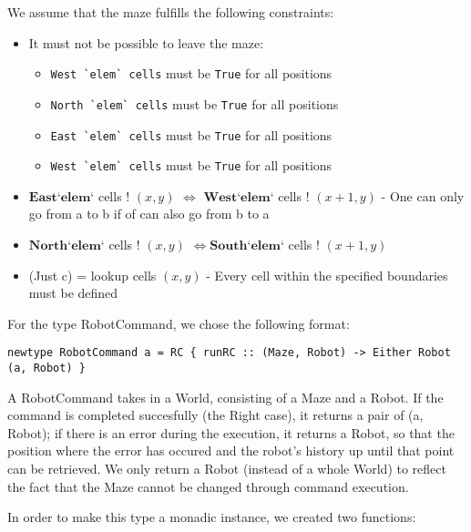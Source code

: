 \documentclass[a4paper]{article}
\newcommand{\west}{\ensuremath{\textbf{West}}\xspace}
\newcommand{\east}{\ensuremath{\textbf{East}}\xspace}
\newcommand{\south}{\ensuremath{\textbf{South}}\xspace}
\newcommand{\north}{\ensuremath{\textbf{North}}\xspace}
\newcommand{\el}{\ensuremath{\textbf{`elem`}}\xspace}
\begin{document}
We assume that the maze fulfills the following constraints:  

\begin{itemize}
  \item It must not be possible to leave the maze:
    \begin{itemize}\setlength{\itemsep}{-2pt}
      \item \verb|West `elem` cells| must be \texttt{True} for all positions 
      \item \verb|North `elem` cells| must be \texttt{True} for all positions 
      \item \verb|East `elem` cells| must be \texttt{True} for all positions 
      \item \verb|West `elem` cells| must be \texttt{True} for all positions 
    \end{itemize}
  \item \east \el cells ! $(x, y)$ $\Leftrightarrow$ \west \el cells ! $(x+1, y)$ - One can only go from a to b if of can also go from b to a
  \item \north \el cells ! $(x, y)$ $\Leftrightarrow$\south \el cells ! $(x+1, y)$
  \item (Just c) = lookup cells $(x,y)$ - Every cell within the specified boundaries must be defined
\end{itemize}

For the type RobotCommand, we chose the following format:
\begin{verbatim}
newtype RobotCommand a = RC { runRC :: (Maze, Robot) -> Either Robot (a, Robot) }
\end{verbatim}
A RobotCommand takes in a World, consisting of a Maze and a Robot. If the command is completed succesfully (the Right case), it returns a pair of (a, Robot); if there is an error during the execution, it returns a Robot, so that the position where the error has occured and the robot's history up until that point can be retrieved. We only return a Robot (instead of a whole World) to reflect the fact that the Maze cannot be changed through command execution.

In order to make this type a monadic instance, we created two functions:
\end{document}
